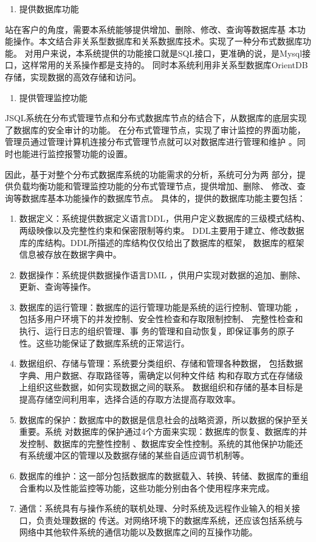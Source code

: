 	\begin{enumerate}[resume]
		\item 提供数据库功能
	\end{enumerate}

	站在客户的角度，需要本系统能够提供增加、删除、修改、查询等数据库基
	本功能操作。本文结合非关系型数据库和关系数据库技术。实现了一种分布式数据库功能。
	对用户来说，本系统提供的功能接口就是SQL接口，更准确的说，是Mysql接口，这样常用的关系操作都是支持的。
	同时本系统利用非关系型数据库OrientDB存储，实现数据的高效存储和访问。
	
	\begin{enumerate}[resume]
		\item 提供管理监控功能
	\end{enumerate}

	JSQL系统在分布式管理节点和分布式数据库节点的结合下，从数据库的底层实现了数据库的安全审计的功能。
	在分布式管理节点，实现了审计监控的界面功能，管理员通过管理计算机连接分布式管理节点就可以对数据库进行管理和维护
	。同时也能进行监控报警功能的设置。


	因此，基于对整个分布式数据库系统的功能需求的分析，系统可分为两
	部分，提供负载均衡功能和管理监控功能的分布式管理节点，提供增加、删除、
	修改、查询等数据库基本功能操作的数据库节点。
具体的，提供的数据库功能主要包括：
\begin{enumerate}[fullwidth,itemindent=2em,listparindent=2em]
	\item 数据定义：系统提供数据定义语言DDL，供用户定义数据库的三级模式结构、两级映像以及完整性约束和保密限制等约束。
	DDL主要用于建立、修改数据库的库结构。DDL所描述的库结构仅仅给出了数据库的框架，
	数据库的框架信息被存放在数据字典中。
	\item 数据操作：系统提供数据操作语言DML
	，供用户实现对数据的追加、删除、更新、查询等操作。
	\item 数据库的运行管理：数据库的运行管理功能是系统的运行控制、管理功能
	，包括多用户环境下的并发控制、安全性检查和存取限制控制、
	完整性检查和执行、运行日志的组织管理、事
	务的管理和自动恢复，即保证事务的原子性。这些功能保证了数据库系统的正常运行。
	\item 数据组织、存储与管理：系统要分类组织、存储和管理各种数据，
	包括数据字典、用户数据、存取路径等，需确定以何种文件结
	构和存取方式在存储级上组织这些数据，如何实现数据之间的联系。
	数据组织和存储的基本目标是提高存储空间利用率，选择合适的存取方法提高存取效率。
	\item   数据库的保护：数据库中的数据是信息社会的战略资源，所以数据的保护至关重要。系统
	对数据库的保护通过4个方面来实现：数据库的恢复、数据库的并发控制、数据库的完整性控制
	、数据库安全性控制。系统的其他保护功能还有系统缓冲区的管理以及数据存储的某些自适应调节机制等。
	\item  数据库的维护：这一部分包括数据库的数据载入、转换、转储、数据库的重组合重构以及性能监控等功能，这些功能分别由各个使用程序来完成。
	\item 通信：系统具有与操作系统的联机处理、分时系统及远程作业输入的相关接口，负责处理数据的
	传送。对网络环境下的数据库系统，还应该包括系统与网络中其他软件系统的通信功能以及数据库之间的互操作功能。
\end{enumerate}
